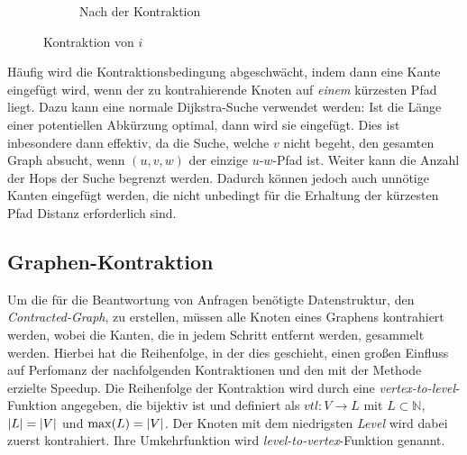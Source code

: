\begin{figure}[ht]
\begin{subfigure}[b]{0.49\textwidth}
{
    }
    \caption{Nach der Kontraktion}
  \end{subfigure}
  \caption{Kontraktion von $i$}
  \label{graphs:fig:example_contraction}
\end{figure}

Häufig wird die Kontraktionsbedingung abgeschwächt, indem dann eine Kante eingefügt wird, wenn der zu kontrahierende Knoten auf \emph{einem} kürzesten Pfad liegt.
Dazu kann eine normale Dijkstra-Suche verwendet werden: Ist die Länge einer potentiellen Abkürzung optimal, dann wird sie eingefügt.
Dies ist inbesondere dann effektiv, da die Suche, welche $v$ nicht begeht, den gesamten Graph absucht, wenn $(u, v, w)$ der einzige $u$-$w$-Pfad ist.
Weiter kann die Anzahl der Hops der Suche begrenzt werden.
Dadurch können jedoch auch unnötige Kanten eingefügt werden, die nicht unbedingt für die Erhaltung der kürzesten Pfad Distanz erforderlich sind.

\subsection{Graphen-Kontraktion}

Um die für die Beantwortung von Anfragen benötigte Datenstruktur, den \emph{Contracted-Graph}, zu erstellen, müssen alle Knoten eines Graphens kontrahiert werden, wobei die Kanten, die in jedem Schritt entfernt werden, gesammelt werden.
Hierbei hat die Reihenfolge, in der dies geschieht, einen großen Einfluss auf Perfomanz der nachfolgenden Kontraktionen und den mit der Methode erzielte Speedup.
Die Reihenfolge der Kontraktion wird durch eine \emph{vertex-to-level}-Funktion angegeben, die bijektiv ist und definiert als ${vtl} \colon V \to L$ mit $L \subset \mathbb{N}$, $\abs{L} = \abs{V}$ und $\max(L) = \abs{V}$.
Der Knoten mit dem niedrigsten \emph{Level} wird dabei zuerst kontrahiert.
Ihre Umkehrfunktion wird \emph{level-to-vertex}-Funktion genannt.

